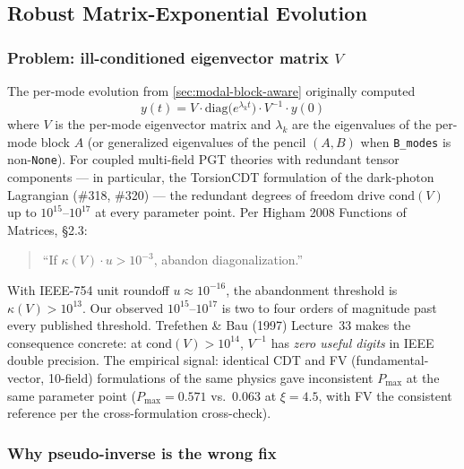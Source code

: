 \subsection{Robust Matrix-Exponential Evolution}
\label{sec:modal-robust-matrix-exp}

\subsubsection{Problem: ill-conditioned eigenvector matrix \texorpdfstring{$V$}{V}}

The per-mode evolution from \cref{sec:modal-block-aware} originally computed
\begin{equation}
y(t) = V \cdot \mathrm{diag}\bigl(e^{\lambda_k t}\bigr) \cdot V^{-1} \cdot y(0)
\label{eq:modal-eigen-evolution}
\end{equation}
where $V$ is the per-mode eigenvector matrix and $\lambda_k$ are the eigenvalues of the per-mode block $A$ (or generalized eigenvalues of the pencil $(A,B)$ when \texttt{B\_modes} is non-\texttt{None}). For coupled multi-field PGT theories with redundant tensor components --- in particular, the TorsionCDT formulation of the dark-photon Lagrangian (\#318, \#320) --- the redundant degrees of freedom drive $\mathrm{cond}(V)$ up to $10^{15}\text{--}10^{17}$ at every parameter point. Per Higham 2008 Functions of Matrices, \S2.3:
\begin{quote}
``If $\kappa(V) \cdot u > 10^{-3}$, abandon diagonalization.''
\end{quote}
With IEEE-754 unit roundoff $u \approx 10^{-16}$, the abandonment threshold is $\kappa(V) > 10^{13}$. Our observed $10^{15}\text{--}10^{17}$ is two to four orders of magnitude past every published threshold. Trefethen \& Bau (1997) Lecture~33 makes the consequence concrete: at $\mathrm{cond}(V) > 10^{14}$, $V^{-1}$ has \emph{zero useful digits} in IEEE double precision. The empirical signal: identical CDT and FV (fundamental-vector, 10-field) formulations of the same physics gave inconsistent $P_\text{max}$ at the same parameter point (\(P_\text{max} = 0.571\) vs.\ \(0.063\) at $\xi = 4.5$, with FV the consistent reference per the cross-formulation cross-check).

\subsubsection{Why pseudo-inverse is the wrong fix}
\label{sec:modal-pinv-wrong}


